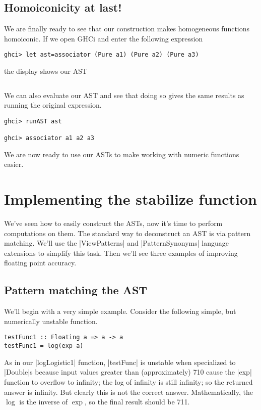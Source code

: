 \documentclass[preprint]{sigplanconf}
\theoremstyle{definition}
\begin{document}
\subsection{Homoiconicity at last!}
We are finally ready to see that our construction makes homogeneous functions homoiconic.
If we open GHCi and enter the following expression
\begin{lstlisting}
ghci> let ast=associator (Pure a1) (Pure a2) (Pure a3)
\end{lstlisting}
the display shows our AST
\begin{lstlisting}
\end{lstlisting}
We can also evaluate our AST and see that doing so gives the same results as running the original expression.
\begin{lstlisting}
ghci> runAST ast

ghci> associator a1 a2 a3

\end{lstlisting}
We are now ready to use our ASTs to make working with numeric functions easier.

\section{Implementing the stabilize function}

We've seen how to easily construct the ASTs,
now it's time to perform computations on them.
The standard way to deconstruct an AST is via pattern matching.
We'll use the |ViewPatterns| and |PatternSynonyms| language extensions to simplify this task.
Then we'll see three examples of improving floating point accuracy.

\subsection{Pattern matching the AST}

We'll begin with a very simple example.
Consider the following simple, but numerically unstable function.
\begin{lstlisting}
testFunc1 :: Floating a => a -> a
testFunc1 = log(exp a)
\end{lstlisting}
As in our |logLogistic1| function, |testFunc| is unstable when specialized to |Double|s
because input values greater than (approximately) 710 cause the |exp| function to overflow to infinity;
the log of infinity is still infinity;
so the returned answer is infinity.
But clearly this is not the correct answer.
Mathematically, the $\log$ is the inverse of $\exp$, so the final result should be 711.
\end{document}
